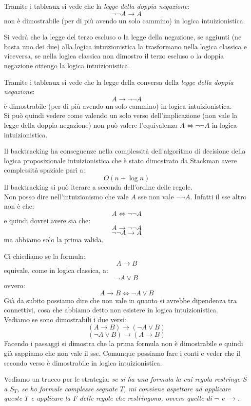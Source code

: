 \documentclass[a4paper,12pt, oneside]{book}
\begin{document}
\begin{esempio}
  Tramite i tableaux si vede che la \emph{legge della doppia negazione}:
  \[\neg\neg A\to A\]
  non è dimostrabile (per di più avendo un solo cammino) in logica
  intuizionistica. 
\end{esempio}
Si vedrà che la legge del terzo escluso o la legge della negazione, se aggiunti
(ne basta uno dei due)
alla logica intuizionistica la trasformano nella logica classica e viceversa, se
nella logica classica non dimostro il terzo escluso o la doppia negazione
ottengo la logica intuizionistica.
\begin{esempio}
  Tramite i tableaux si vede che la legge della conversa della \emph{legge della
    doppia negazione}: 
  \[A\to \neg\neg A\]
  è dimostrabile (per di più avendo un solo cammino) in logica
  intuizionistica. \\ 
  Si può quindi vedere come valendo un solo verso dell'implicazione (non vale la
  legge della doppia negazione) non può valere l'equivalenza $A\iff\neg \neg A$
  in logica intuizionistica.
\end{esempio}
Il backtracking ha conseguenze nella complessità dell'algoritmo di decisione
della logica proposizionale intuizionistica che è stato dimostrato da Stackman
avere complessità spaziale pari a: 
\[O(n+\log n)\]
Il backtracking si può iterare a seconda dell'ordine delle regole.\\
Non posso dire nell'intuizionismo che vale $A$ sse non vale $\neg\neg
A$. Infatti il sse altro non è che:
\[A\iff\neg \neg A\]
e quindi dovrei avere sia che:
\[A\to\neg \neg A\]
\[\neg \neg A\to A\]
ma abbiamo solo la prima valida.
\begin{esempio}
  Ci chiediamo se la formula:
  \[A\to B\]
  equivale, come in logica classica, a:
  \[\neg A\lor B\]
  ovvero:
  \[A\to B\iff \neg A\lor B\]
  Già da subito possiamo dire che non vale in quanto si avrebbe dipendenza tra
  connettivi, cosa che abbiamo detto non esistere in logica intuizionistica.\\
  Vediamo se sono dimostrabili i due versi:
  \[(A\to B)\to(\neg A\lor B)\]
  \[(\neg A\lor B)\to(A\to B)\]
  Facendo i passaggi si dimostra che la prima formula non è dimostrabile e
  quindi già sappiamo che non vale il sse. Comunque possiamo fare i conti e
  veder che il secondo verso è dimostrabile in logica intuizionistica.
\end{esempio}
\noindent
Vediamo un trucco per le strategia:
\textit{se si ha una formula la cui regola restringe $S$ a $S_T$, se ho formule
complesse segnate $T$, mi conviene aspettare ad applicare queste $T$ e
applicare la $F$ delle regole che restringono, ovvero quelle di $\neg$ e
$\to$.}\\
\end{document}

